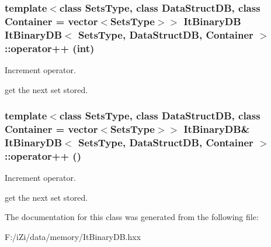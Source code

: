 \subsubsection{\setlength{\rightskip}{0pt plus 5cm}template$<$class Sets\-Type, class Data\-Struct\-DB, class Container = vector$<$Sets\-Type$>$$>$ {\bf It\-Binary\-DB} {\bf It\-Binary\-DB}$<$ Sets\-Type, Data\-Struct\-DB, Container $>$::operator++ (int)\hspace{0.3cm}{\tt  [inline]}}\label{class_it_binary_d_b_85521883adc83343d2e3b0ce82ef1adc}


Increment operator. 

get the next set stored. 
\subsubsection{\setlength{\rightskip}{0pt plus 5cm}template$<$class Sets\-Type, class Data\-Struct\-DB, class Container = vector$<$Sets\-Type$>$$>$ {\bf It\-Binary\-DB}\& {\bf It\-Binary\-DB}$<$ Sets\-Type, Data\-Struct\-DB, Container $>$::operator++ ()\hspace{0.3cm}{\tt  [inline]}}\label{class_it_binary_d_b_b3ebf157e20f4fc8a4fca5172e469210}


Increment operator. 

get the next set stored. 

The documentation for this class was generated from the following file:\begin{CompactItemize}
\item 
F:/i\-Zi/data/memory/It\-Binary\-DB.hxx\end{CompactItemize}
